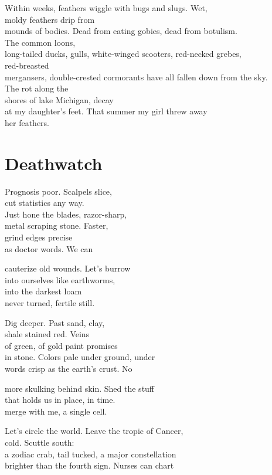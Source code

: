 \documentclass[twoside,10pt]{book}
\begin{document}
Within weeks, feathers wiggle with bugs and slugs. Wet,\\
moldy feathers drip from\\
mounds of bodies. Dead from eating gobies, dead from botulism.\\
The common loons,\\
long-tailed ducks, gulls, white-winged scooters, red-necked grebes,\\
red-breasted\\
mergansers, double-crested cormorants have all fallen down from the
sky.\\
The rot along the\\
shores of lake Michigan, decay\\
at my daughter's feet. That summer my girl threw away\\
her feathers.


\clearpage
\section{Deathwatch}

Prognosis poor. Scalpels slice,\\
cut statistics any way.\\
Just hone the blades, razor-sharp,\\
metal scraping stone. Faster,\\
grind edges precise\\
as doctor words. We can

cauterize old wounds. Let's burrow\\
into ourselves like earthworms,\\
into the darkest loam\\
never turned, fertile still.

Dig deeper. Past sand, clay,\\
shale stained red. Veins\\
of green, of gold paint promises\\
in stone. Colors pale under ground, under\\
words crisp as the earth's crust. No

more skulking behind skin. Shed the stuff\\
that holds us in place, in time.\\
merge with me, a single cell.

Let's circle the world. Leave the tropic of Cancer,\\
cold. Scuttle south:\\
a zodiac crab, tail tucked, a major constellation\\
brighter than the fourth sign. Nurses can chart
\end{document}
